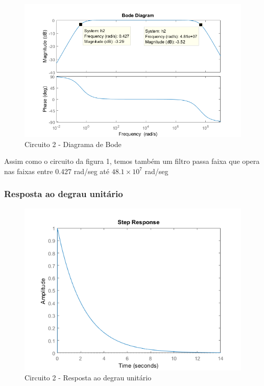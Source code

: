\documentclass[a4paper, 12pt]{article}
\begin{document}
			\begin{figure}[!ht]
				\centering
				\includegraphics[scale=0.7]{img/1f_circ2.png}
				\caption{Circuito 2 - Diagrama de Bode}
			\end{figure}
			\newpage
			Assim como o circuito da figura 1, temos também um filtro passa faixa que opera nas faixas entre 0.427 rad/seg até $48.1\times10^{7}$ rad/seg

			\subsubsection{Resposta ao degrau unitário}
			\begin{figure}[!ht]
				\centering
				\includegraphics[scale=0.68]{img/1g_circ2.png}
				\caption{Circuito 2 - Resposta ao degrau unitário}
			\end{figure}
\end{document}
